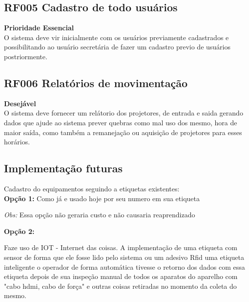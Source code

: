 \subsection{\textbf{RF005 Cadastro de todo usuários}}

  \textbf{Prioridade Essencial} \\


  O sistema deve vir inicialmente com os usuários previamente cadastrados e
  possibilitando ao usuário secretária de fazer um cadastro previo de usuários
  postriormente.


\subsection{\textbf{RF006 Relatórios de movimentação}} 

  \textbf{Desejável} \\
  
  O sistema deve fornecer um relátorio dos projetores, de entrada e saida
  gerando dados que ajude ao sistema prever quebras como mal uso dos mesmo,
  hora de maior saída, como também a remanejação ou aquisição de projetores
  para esses horários. 


\subsection{\textbf{Implementação futuras}} 

  Cadastro do equipamentos seguindo a etiquetas existentes: 
  \\
  \textbf{Opção 1:} Como já e usado hoje por seu numero em sua etiqueta

  \textit{Obs:} Essa opção não geraria custo e não causaria reaprendizado
 
 
  \textbf{Opção 2:}
 
  Faze uso de IOT - Internet das coisas. A implementação de uma etiqueta com sensor de forma que ele fosse lido pelo
  sistema ou um adesivo Rfid uma etiqueta inteligente o operador de forma automática tivesse o retorno dos dados com
  essa etiqueta depois de sua inspeção manual de todos os aparatos do aparelho com "cabo hdmi, cabo de força" e outras
  coisas retiradas no momento da coleta do mesmo. 

